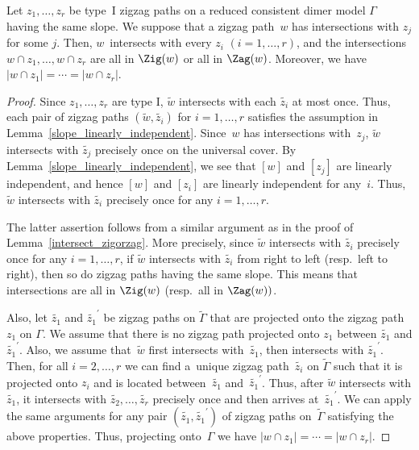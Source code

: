 \begin{Lemma}\label{intersect_zigorzag2}
Let $z_1,\dots,z_r$ be type~I zigzag paths on a reduced consistent dimer model $\Gamma$ having the same slope.
We suppose that a zigzag path~$w$ has intersections with $z_j$ for some $j$.
Then, $w$~intersects with every $z_i$ $(i=1,\dots,r)$, and the intersections $w\cap z_1,\dots, w\cap z_r$ are all in $\Zig(w)$ or all in $\Zag(w)$.
Moreover, we have $|w\cap z_1|=\cdots=|w\cap z_r|$.
\end{Lemma}

\begin{proof}
Since $z_1,\dots,z_r$ are type I, $\widetilde{w}$ intersects with each $\widetilde{z_i}$ at most once.
Thus, each pair of zigzag paths $(\widetilde{w},\widetilde{z_i})$ for $i=1,\dots,r$ satisfies the assumption in Lemma~\ref{slope_linearly_independent}.
Since~$w$ has intersections with~$z_j$, $\widetilde{w}$ intersects with $\widetilde{z_j}$ precisely once on the universal cover.
By Lemma~\ref{slope_linearly_independent}, we see that $[w]$ and $[z_j]$ are linearly independent, and hence $[w]$ and $[z_i]$ are linearly independent for any~$i$.
Thus, $\widetilde{w}$ intersects with $\widetilde{z_i}$ precisely once for any $i=1,\dots,r$.

The latter assertion follows from a similar argument as in the proof of Lemma~\ref{intersect_zigorzag}.
More precisely, since $\widetilde{w}$ intersects with $\widetilde{z_i}$ precisely once for any $i=1,\dots,r$,
if $\widetilde{w}$ intersects with $\widetilde{z_i}$ from right to left (resp.\ left to right), then so do zigzag paths having the same slope.
This means that intersections are all in $\Zig(w)$ (resp.\ all in $\Zag(w))$.

Also, let $\widetilde{z_1}$ and $\widetilde{z_1}^\prime$ be zigzag paths on $\widetilde{\Gamma}$ that are projected onto the zigzag path $z_1$ on $\Gamma$.
We assume that there is no zigzag path projected onto $z_1$ between $\widetilde{z_1}$ and $\widetilde{z_1}^\prime$.
Also, we assume that~$\widetilde{w}$ first intersects with~$\widetilde{z_1}$, then intersects with $\widetilde{z_1}^\prime$.
Then, for all $i=2,\dots,r$ we can find a~unique zigzag path~$\widetilde{z_i}$ on $\widetilde{\Gamma}$ such that it is projected onto $z_i$ and is located between~$\widetilde{z_1}$ and~$\widetilde{z_1}^\prime$.
Thus, after $\widetilde{w}$ intersects with $\widetilde{z_1}$, it intersects with $\widetilde{z_2}, \dots, \widetilde{z_r}$ precisely once and then arrives at~$\widetilde{z_1}^\prime$.
We can apply the same arguments for any pair $(\widetilde{z_1},\widetilde{z_1}^\prime)$ of zigzag paths on~$\widetilde{\Gamma}$ satisfying the above properties. Thus, projecting onto~$\Gamma$ we have $|w\cap z_1|=\cdots=|w\cap z_r|$.
\end{proof}
